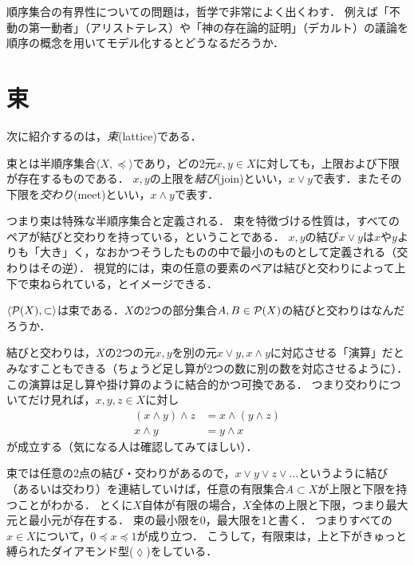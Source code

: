 \documentclass[11pt,a4paper]{jsarticle}
\begin{document}
\begin{example}
順序集合の有界性についての問題は，哲学で非常によく出くわす．
例えば「不動の第一動者」（アリストテレス）や「神の存在論的証明」（デカルト）の議論を順序の概念を用いてモデル化するとどうなるだろうか．
\end{example}



\section{束}

次に紹介するのは，\emph{束}(lattice)である．

\begin{dfn}[束]
束とは半順序集合$\langle X, \preceq \rangle$であり，どの2元$x, y \in X$に対しても，上限および下限が存在するものである．
$x, y$の上限を\emph{結び}(join)といい，$x \vee y$で表す．またその下限を\emph{交わり}(meet)といい，$x \wedge y$で表す．
\end{dfn}

つまり束は特殊な半順序集合と定義される．
束を特徴づける性質は，すべてのペアが結びと交わりを持っている，ということである．
$x,y$の結び$x \vee y$は$x$や$y$よりも「大き」く，なおかつそうしたものの中で最小のものとして定義される（交わりはその逆）．
視覚的には，束の任意の要素のペアは結びと交わりによって上下で束ねられている，とイメージできる．

\begin{exercise}
 $\langle \mathcal{P}(X), \subset \rangle$は束である．$X$の2つの部分集合$A, B \in \mathcal{P}(X)$の結びと交わりはなんだろうか．
\end{exercise}

結びと交わりは，$X$の2つの元$x,y$を別の元$x \vee y, x \wedge y$に対応させる「演算」だとみなすこともできる（ちょうど足し算が2つの数に別の数を対応させるように）．
この演算は足し算や掛け算のように結合的かつ可換である．
つまり交わりについてだけ見れば，$x, y, z \in X$に対し
\begin{align}
(x \wedge y) \wedge z &= x \wedge (y \wedge z) \\
x \wedge y &= y \wedge x
\end{align}
が成立する（気になる人は確認してみてほしい）．


束では任意の2点の結び・交わりがあるので，$x \vee y \vee z \vee \dots$というように結び（あるいは交わり）を連結していけば，任意の有限集合$A \subset X$が上限と下限を持つことがわかる．
とくに$X$自体が有限の場合，$X$全体の上限と下限，つまり最大元と最小元が存在する．
束の最小限を0，最大限を1と書く．
つまりすべての$x \in X$について，$0 \preceq x \preceq 1$が成り立つ．
こうして，有限束は，上と下がきゅっと縛られたダイアモンド型($\lozenge$)をしている．
\end{document}
